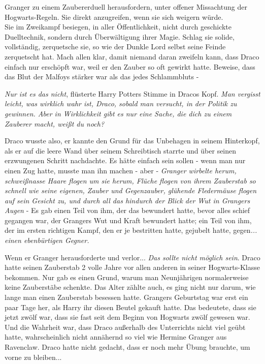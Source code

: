 {Granger zu einem Zaubererduell herausfordern, unter offener Missachtung der Hogwarts-Regeln. Sie direkt anzugreifen, wenn sie sich weigern würde.\\ Sie im Zweikampf besiegen, in aller Öffentlichkeit, nicht durch geschickte Duelltechnik, sondern durch Überwältigung ihrer Magie. Schlag sie solide, vollständig, zerquetsche sie, so wie der Dunkle Lord selbst seine Feinde zerquetscht hat. Mach allen klar, damit niemand daran zweifeln kann, dass Draco einfach nur erschöpft war, weil er den Zauber so oft gewirkt hatte. Beweise, dass das Blut der Malfoys stärker war als das jedes Schlammbluts -

\emph{Nur ist es das nicht}, flüsterte Harry Potters Stimme in Dracos Kopf. \emph{Man vergisst leicht, was wirklich wahr ist, Draco, sobald man versucht, in der Politik zu gewinnen. Aber in Wirklichkeit gibt es nur eine Sache, die dich zu einem Zauberer macht, weißt du noch?}

Draco wusste also, er kannte den Grund für das Unbehagen in seinem Hinterkopf, als er auf die leere Wand über seinem Schreibtisch starrte und über seinen erzwungenen Schritt nachdachte. Es hätte einfach sein sollen - wenn man nur einen Zug hatte, musste man ihn machen - aber - \emph{Granger wirbelte herum, schweißnasse Haare flogen um sie herum, Flüche flogen von ihrem Zauberstab so schnell wie seine eigenen, Zauber und Gegenzauber, glühende Fledermäuse flogen auf sein Gesicht zu, und durch all das hindurch der Blick der Wut in Grangers Augen} - Es gab einen Teil von ihm, der das bewundert hatte, bevor alles schief gegangen war, der Grangers Wut und Kraft bewundert hatte; ein Teil von ihm, der im ersten richtigen Kampf, den er je bestritten hatte, gejubelt hatte, gegen\emph{... einen ebenbürtigen Gegner.}

Wenn er Granger herausforderte und verlor... \emph{Das sollte nicht möglich sein}. Draco hatte seinen Zauberstab 2 volle Jahre vor allen anderen in seiner Hogwarts-Klasse bekommen. Nur gab es einen Grund, warum man Neunjährigen normalerweise keine Zauberstäbe schenkte. Das Alter zählte auch, es ging nicht nur darum, wie lange man einen Zauberstab besessen hatte. Grangers Geburtstag war erst ein paar Tage her, als Harry ihr diesen Beutel gekauft hatte. Das bedeutete, dass sie jetzt zwölf war, dass sie fast seit dem Beginn von Hogwarts zwölf gewesen war. Und die Wahrheit war, dass Draco außerhalb des Unterrichts nicht viel geübt hatte, wahrscheinlich nicht annähernd so viel wie Hermine Granger aus Ravenclaw. Draco hatte nicht gedacht, dass er noch mehr Übung brauchte, um vorne zu bleiben...

}
